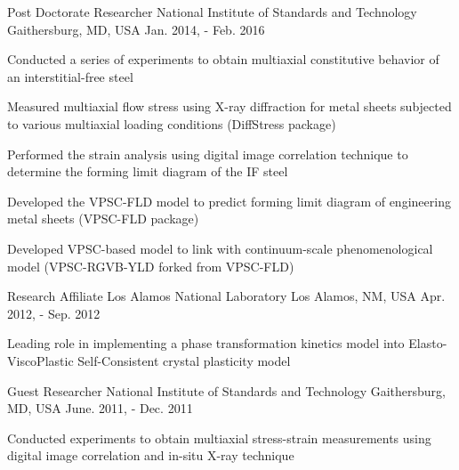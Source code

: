 \begin{cventries}
  \cventry
  {Post Doctorate Researcher} %
  {National Institute of Standards and Technology} %
  {Gaithersburg, MD, USA} %
  {Jan. 2014, - Feb. 2016} %
  {
    \begin{cvitems} %
    \item {Conducted a series of experiments to obtain multiaxial constitutive behavior of an interstitial-free steel}
    \item {Measured multiaxial flow stress using X-ray diffraction for metal sheets subjected to various multiaxial loading conditions (DiffStress package)}
    \item {Performed the strain analysis using digital image correlation technique to determine the forming limit diagram of the IF steel}
    \item {Developed the VPSC-FLD model to predict forming limit diagram of engineering metal sheets (VPSC-FLD package)}
    \item {Developed VPSC-based model to link with continuum-scale phenomenological model (VPSC-RGVB-YLD forked from VPSC-FLD)}
    \end{cvitems}
  }

  \cventry
  {Research Affiliate} %
  {Los Alamos National Laboratory} %
  {Los Alamos, NM, USA} %
  {Apr. 2012, - Sep. 2012} %
  {
    \begin{cvitems} %
      {Leading role in implementing a phase transformation kinetics model into Elasto-ViscoPlastic Self-Consistent crystal plasticity model}
    \end{cvitems}
  }

  \cventry
  {Guest Researcher} %
  {National Institute of Standards and Technology} %
  {Gaithersburg, MD, USA} %
  {June. 2011, - Dec. 2011} %
  {
    \begin{cvitems} %
      {Conducted experiments to obtain multiaxial stress-strain measurements using digital image correlation and in-situ X-ray technique}
    \end{cvitems}
  }



\end{cventries}

